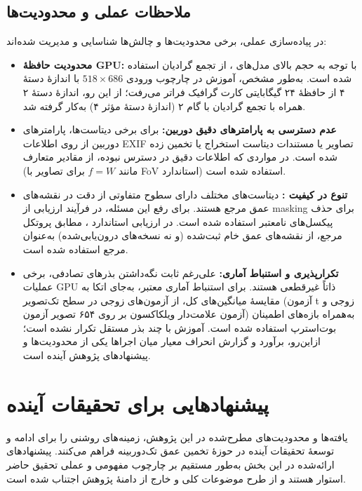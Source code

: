 \subsection{ملاحظات عملی و محدودیت‌ها}

در پیاده‌سازی عملی، برخی محدودیت‌ها و چالش‌ها شناسایی و مدیریت شده‌اند:

\begin{itemize}
    \item \textbf{محدودیت حافظهٔ GPU:} با توجه به حجم بالای مدل‌های ، از تجمع گرادیان استفاده شده است. به‌طور مشخص، آموزش  در چارچوب ورودی $518 \times 686$ با اندازهٔ دستهٔ ۴ از حافظهٔ ۲۴ گیگابایتی کارت گرافیک فراتر می‌رفت؛ از این رو، اندازهٔ دستهٔ ۲ همراه با تجمع گرادیان با گام ۲ (اندازهٔ دستهٔ مؤثر ۴) به‌کار گرفته شد.

    \item \textbf{عدم دسترسی به پارامترهای دقیق دوربین:} برای برخی دیتاست‌ها، پارامترهای دوربین از روی اطلاعات EXIF تصاویر یا مستندات دیتاست استخراج یا تخمین زده شده است. در مواردی که اطلاعات دقیق در دسترس نبوده، از مقادیر متعارف (مانند $f = W$ برای تصاویر با FoV استاندارد) استفاده شده است.

    \item \textbf{تنوع در کیفیت :} دیتاست‌های مختلف دارای سطوح متفاوتی از دقت در نقشه‌های عمق مرجع هستند. برای رفع این مسئله، در فرآیند ارزیابی از masking برای حذف پیکسل‌های نامعتبر استفاده شده است. در ارزیابی استاندارد ، مطابق پروتکل مرجع، از نقشه‌های عمق خام ثبت‌شده (و نه نسخه‌های درون‌یابی‌شده) به‌عنوان مرجع استفاده شده است.

    \item \textbf{تکرارپذیری و استنباط آماری:} علی‌رغم ثابت نگه‌داشتن بذرهای تصادفی، برخی عملیات GPU ذاتاً غیرقطعی هستند. برای استنباط آماری معتبر، به‌جای اتکا به مقایسهٔ میانگین‌های کل، از آزمون‌های زوجی در سطح تک‌تصویر (آزمون t زوجی و آزمون علامت‌دار ویلکاکسون بر روی ۶۵۴ تصویر آزمون) به‌همراه بازه‌های اطمینان بوت‌استرپ استفاده شده است. آموزش با چند بذر مستقل تکرار نشده است؛ ازاین‌رو، برآورد و گزارش انحراف معیار میان اجراها یکی از محدودیت‌ها و پیشنهادهای پژوهش آینده است.
\end{itemize}


\section{پیشنهادهایی برای تحقیقات آینده}
\label{sec:chapter5_future_work}

یافته‌ها و محدودیت‌های مطرح‌شده در این پژوهش،
زمینه‌های روشنی را برای ادامه و توسعهٔ تحقیقات آینده
در حوزهٔ تخمین عمق تک‌دوربینه فراهم می‌کنند.
پیشنهادهای ارائه‌شده در این بخش
به‌طور مستقیم بر چارچوب مفهومی و عملی
تحقیق حاضر استوار هستند
و از طرح موضوعات کلی و خارج از دامنهٔ پژوهش
اجتناب شده است.

